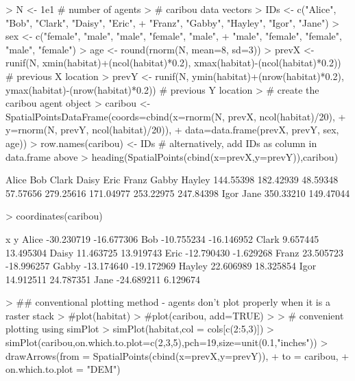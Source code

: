 \documentclass{article}
\begin{document}
\begin{Schunk}
\begin{Sinput}
> N <- 1e1 # number of agents
> # caribou data vectors
> IDs <- c("Alice", "Bob", "Clark", "Daisy", "Eric",
+          "Franz", "Gabby", "Hayley", "Igor", "Jane")
> sex <- c("female", "male", "male", "female", "male",
+          "male", "female", "female", "male", "female")
> age <- round(rnorm(N, mean=8, sd=3))
> prevX <- runif(N, xmin(habitat)+(ncol(habitat)*0.2), xmax(habitat)-(ncol(habitat)*0.2)) # previous X location
> prevY <- runif(N, ymin(habitat)+(nrow(habitat)*0.2), ymax(habitat)-(nrow(habitat)*0.2)) # previous Y location
> # create the caribou agent object
> caribou <- SpatialPointsDataFrame(coords=cbind(x=rnorm(N, prevX, ncol(habitat)/20),
+                                                y=rnorm(N, prevY, ncol(habitat)/20)),
+                                   data=data.frame(prevX, prevY, sex, age))
> row.names(caribou) <- IDs # alternatively, add IDs as column in data.frame above
> heading(SpatialPoints(cbind(x=prevX,y=prevY)),caribou)
\end{Sinput}
\begin{Soutput}
    Alice       Bob     Clark     Daisy      Eric     Franz     Gabby    Hayley 
144.55398 182.42939  48.59348  57.57656 279.25616 171.04977 253.22975 247.84398 
     Igor      Jane 
350.33210 149.47044 
\end{Soutput}
\begin{Sinput}
> coordinates(caribou)
\end{Sinput}
\begin{Soutput}
                x          y
Alice  -30.230719 -16.677306
Bob    -10.755234 -16.146952
Clark    9.657445  13.495304
Daisy   11.463725  13.919743
Eric   -12.790430  -1.629268
Franz   23.505723 -18.996257
Gabby  -13.174640 -19.172969
Hayley  22.606989  18.325854
Igor    14.912511  24.787351
Jane   -24.689211   6.129674
\end{Soutput}
\begin{Sinput}
> ## conventional plotting method - agents don't plot properly when it is a raster stack
> #plot(habitat)
> #plot(caribou, add=TRUE)
> 
> # convenient plotting using simPlot
> simPlot(habitat,col = cols[c(2:5,3)])
> simPlot(caribou,on.which.to.plot=c(2,3,5),pch=19,size=unit(0.1,"inches"))
> drawArrows(from = SpatialPoints(cbind(x=prevX,y=prevY)),
+            to = caribou,
+            on.which.to.plot = "DEM")
\end{Sinput}
\end{Schunk}
\end{document}
